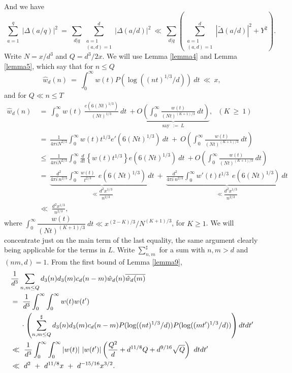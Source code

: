 \documentclass[oneside,reqno,10pt]{amsart}
\numberwithin{equation}{section}
\theoremstyle{plain}
\theoremstyle{definition}
\numberwithin{equation}{section}
\begin{document}
And we have
\begin{equation}\label{final touch}
    \sum_{\substack{a=1}}^q |\Delta(a/q)|^2 \ =\ \sum_{d|q} \sum_{\substack{a=1\\ (a,d)=1}}^d |\Delta(a/d)|^2 \ \ll\ \sum_{d|q}\left( \sum_{\substack{a=1\\ (a,d)=1}}^d |\tilde{\Delta}(a/d)|^2 + Y^2 \right).
\end{equation}
Write $N=x/d^3$ and $Q=d^3/2x$. We will use Lemma \ref{lemma4} and Lemma \ref{lemma5}, which say that for $n\leq Q$
\begin{equation}\label{bound for w(n)}
    \hat{w}_d(n)\ =\ \int_{0}^{\infty} w(t) P(\log((nt)^{1/3}/d))\ dt\ \ll\ x,
\end{equation}
and for  $Q\ll n \leq T$
\begin{align}\nonumber
    \hat{w}_d(n)\ &=\ \int_{0}^{\infty} w(t)\ \frac{e(6(Nt)^{1/3})}{(Nt)^{1/3}}\ dt\ + \underbrace{O\left(\int_{0}^{\infty} \frac{w(t)}{(Nt)^{(K+1)/3}}\ dt \right)}_{\text{say}\ \ :=\ L},\ \ \ (K\ \geq \ 1)\\ \nonumber
    &=\ \frac{1}{4\pi iN^{2/3}}\int_{0}^{\infty} w(t) t^{1/3} e'(6(Nt)^{1/3})\ dt\ +\ O\left(\int_{0}^{\infty} \frac{w(t)}{(Nt)^{(K+1)/3}}\ dt \right)\\ \nonumber
    &\leq \ \frac{1}{4\pi iN^{2/3}} \int_{0}^{\infty} \frac{d}{dt}\left\{w(t)t^{1/3}\right\} e(6(Nt)^{1/3})\ dt\ + O\left(\int_{0}^{\infty} \frac{w(t)}{(Nt)^{(K+1)/3}}\ dt \right)\\ \nonumber
    &=\ \underbrace{\frac{d^2}{4\pi i\ n^{2/3}} \int_{0}^{\infty}\frac{w(t)}{t^{2/3}}\ \ e(6(Nt)^{1/3})\ dt}_{\ll \dfrac{d^2x^{1/3}}{n^{2/3}}}\ +\ \underbrace{\frac{d^2}{4\pi i\ n^{2/3}} \int_{0}^{\infty}w'(t)t^{1/3}\ \ e(6(Nt)^{1/3})\ dt}_{\ll \dfrac{d^2x^{1/3}}{n^{2/3}}}\\ 
    &\ll\ \frac{d^2x^{1/3}}{n^{2/3}},\label{2nd bound for w(n)}
\end{align}
where $\int_{0}^{\infty} \dfrac{w(t)}{(Nt)^{(K+1)/3}}\ dt \ll x^{(2-K)/3}/N^{(K+1)/3} $, for $K\geq 1$. We will concentrate just on the main term of the last equality, the same argument clearly being applicable
for the terms in $L$. Write $\sum_{n,m}^\sharp$ for a sum with $n,m>d$ and $(nm,d)=1$. From the first bound of Lemma \ref{lemma9},
\begin{align}\label{1.}\nonumber
    &\frac{1}{d^3} \sum_{n,m\leq Q} d_3(n)d_3(m)c_d(n-m)\hat{w}_d(n)\overline{\hat{w}_d(m)}\\ \nonumber
    &=\ \frac{1}{d^3} \int_{0}^{\infty}\int_{0}^{\infty} w(t)w(t')\\ \nonumber
    &\hspace{0,5cm}\cdot \left(\sum_{n,m\leq Q}^{\sharp}  d_3(n)d_3(m)c_d(n-m)P(\log((nt)^{1/3}/d))P(\log((mt')^{1/3}/d)) \right)dtdt'\\ \nonumber
    &\ll\ \frac{1}{d^3} \int_{0}^{\infty}\int_{0}^{\infty} |w(t)|\ |w(t')|\left(\frac{Q^2}{d}+d^{11/8}Q+d^{9/16}\sqrt{Q}\right)\ dtdt'\\
    &\ll\ d^2\ +\ d^{11/8} x\ +\ d^{-15/16}x^{3/2}.
\end{align} 
\end{document}
